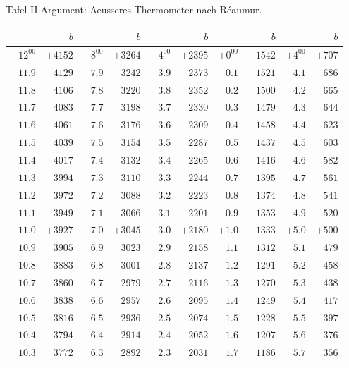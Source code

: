\begin{GaussVIRefractionPlate}{Tafel II.\quad Argument: Aeusseres Thermometer nach Réaumur.}
{\fontsize{9}{10.2}\selectfont\setlength{\tabcolsep}{4pt}
\begin{tabular}{r|r||r|r||r|r||r|r||r|r}
&$b$&&$b$&&$b$&&$b$&&$b$\\\hline
$-12^00$ & $+4152$ & $-8^00$ & $+3264$ & $-4^00$ & $+2395$ & $+0^00$ & $+1542$ & $+4^00$ & $+707$\\
$11.9$ & $4129$ & $7.9$ & $3242$ & $3.9$ & $2373$ & $0.1$ & $1521$ & $4.1$ & $686$\\
$11.8$ & $4106$ & $7.8$ & $3220$ & $3.8$ & $2352$ & $0.2$ & $1500$ & $4.2$ & $665$\\
$11.7$ & $4083$ & $7.7$ & $3198$ & $3.7$ & $2330$ & $0.3$ & $1479$ & $4.3$ & $644$\\
$11.6$ & $4061$ & $7.6$ & $3176$ & $3.6$ & $2309$ & $0.4$ & $1458$ & $4.4$ & $623$\\
$11.5$ & $4039$ & $7.5$ & $3154$ & $3.5$ & $2287$ & $0.5$ & $1437$ & $4.5$ & $603$\\
$11.4$ & $4017$ & $7.4$ & $3132$ & $3.4$ & $2265$ & $0.6$ & $1416$ & $4.6$ & $582$\\
$11.3$ & $3994$ & $7.3$ & $3110$ & $3.3$ & $2244$ & $0.7$ & $1395$ & $4.7$ & $561$\\
$11.2$ & $3972$ & $7.2$ & $3088$ & $3.2$ & $2223$ & $0.8$ & $1374$ & $4.8$ & $541$\\
$11.1$ & $3949$ & $7.1$ & $3066$ & $3.1$ & $2201$ & $0.9$ & $1353$ & $4.9$ & $520$\\[4pt]
$-11.0$ & $+3927$ & $-7.0$ & $+3045$ & $-3.0$ & $+2180$ & $+1.0$ & $+1333$ & $+5.0$ & $+500$\\
$10.9$ & $3905$ & $6.9$ & $3023$ & $2.9$ & $2158$ & $1.1$ & $1312$ & $5.1$ & $479$\\
$10.8$ & $3883$ & $6.8$ & $3001$ & $2.8$ & $2137$ & $1.2$ & $1291$ & $5.2$ & $458$\\
$10.7$ & $3860$ & $6.7$ & $2979$ & $2.7$ & $2116$ & $1.3$ & $1270$ & $5.3$ & $438$\\
$10.6$ & $3838$ & $6.6$ & $2957$ & $2.6$ & $2095$ & $1.4$ & $1249$ & $5.4$ & $417$\\
$10.5$ & $3816$ & $6.5$ & $2936$ & $2.5$ & $2074$ & $1.5$ & $1228$ & $5.5$ & $397$\\
$10.4$ & $3794$ & $6.4$ & $2914$ & $2.4$ & $2052$ & $1.6$ & $1207$ & $5.6$ & $376$\\
$10.3$ & $3772$ & $6.3$ & $2892$ & $2.3$ & $2031$ & $1.7$ & $1186$ & $5.7$ & $356$\\

\end{tabular}}
\end{GaussVIRefractionPlate}
